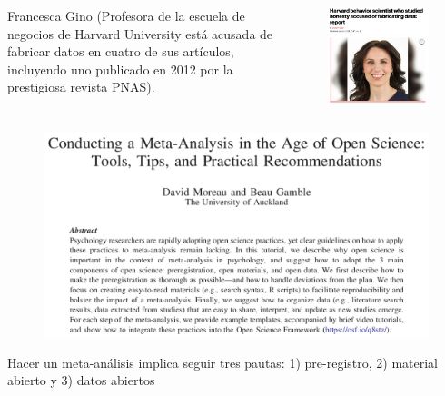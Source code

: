 \documentclass[aspectratio=169]{beamer}
\begin{document}
\begin{frame}
\begin{columns}
\begin{column}{0.5\textwidth}
Francesca Gino (Profesora de la escuela de negocios de Harvard University está acusada de fabricar datos en cuatro de sus artículos, incluyendo uno publicado en 2012 por la prestigiosa revista PNAS).\\
\end{column}
\begin{column}{0.5\textwidth}
\begin{figure}
\includegraphics[width=.7\textwidth]{Gino.png}
\end{figure}   
\end{column}
\end{columns}
\end{frame}

\begin{frame}
\centering
\begin{figure}
\includegraphics[width=0.65\linewidth]{Moreau.png}
\end{figure}
Hacer un meta-análisis implica seguir tres pautas: 1) pre-registro, 2) material abierto y 3) datos abiertos \parencite{Moreau2022}
\end{frame}
\end{document}
